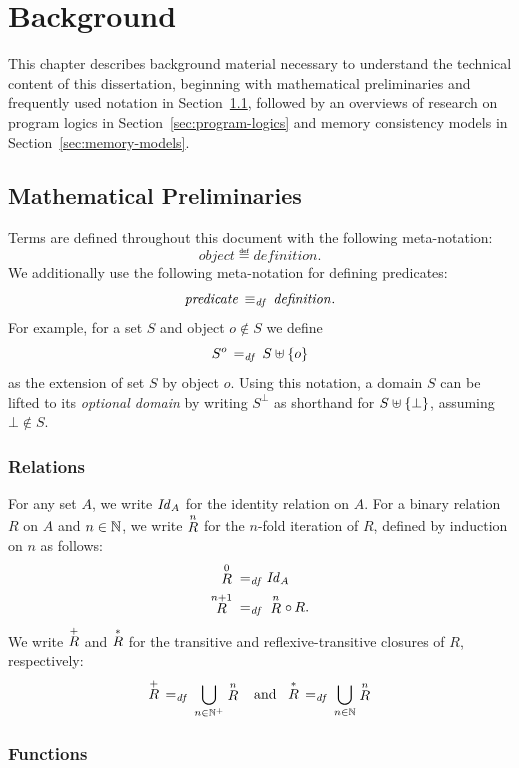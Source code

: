 \documentclass[11pt]{report}
\begin{document}
\chapter{Background}

This chapter describes background material necessary to understand the technical content of this dissertation, beginning with mathematical preliminaries and frequently used notation in Section~\ref{sec:preliminaries}, followed by an overviews of research on program logics in Section~\ref{sec:program-logics} and memory consistency models in Section~\ref{sec:memory-models}. 

\section{Mathematical Preliminaries}
\label{sec:preliminaries}

Terms are defined throughout this document with the following meta-notation: \[ \mathit{object} \eqdef \mathit{definition}.\] We additionally use the following meta-notation for defining predicates: \[ \mathit{predicate} \iffdef \mathit{definition}.\] For example, for a set $S$ and object $o \notin S$ we define \[S^o \eqdef S \uplus \set{o}\] as the extension of set $S$ by object $o$. Using this notation, a domain $S$ can be lifted to its \emph{optional domain} by writing $S^\bot$ as shorthand for $S \uplus \set{\bot}$, assuming $\bot \notin S$. 

\subsection{Relations}
\label{sec:relations}

For any set $A$, we write $\ident{A}$ for the identity relation on $A$. For a binary relation $R$ on $A$ and $n \in \setnaturals$, we write $\relexp{R}{n}$ for the $n$-fold iteration of $R$, defined by induction on $n$ as follows: \begin{align*} \relexp{R}{0} \eqdef &\ident{A} \\ 
\relexp{R}{n+1} \eqdef & \relexp{R}{n} \rcomp R.\end{align*} We write $\tcl{R}$ and $\rtcl{R}$ for the transitive and reflexive-transitive closures of $R$, respectively: \begin{align*}
    \tcl{R} \eqdef \bigcup_{n \in \setpositives} \relexp{R}{n} \andif
    \rtcl{R} \eqdef \bigcup_{n \in \setnaturals} \relexp{R}{n} 
\end{align*}

\subsection{Functions}
\label{sec:functions}
\end{document}
